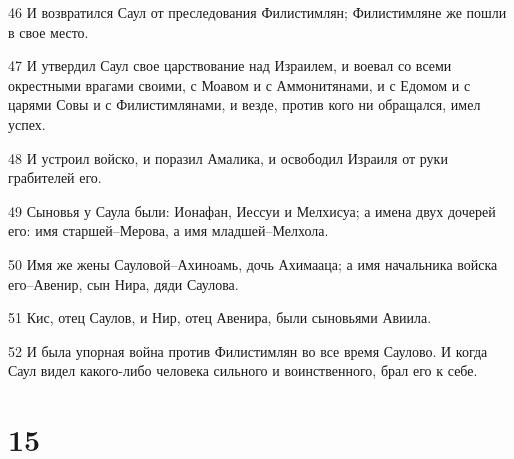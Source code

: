 \par 46 И возвратился Саул от преследования Филистимлян; Филистимляне же пошли в свое место.
\par 47 И утвердил Саул свое царствование над Израилем, и воевал со всеми окрестными врагами своими, с Моавом и с Аммонитянами, и с Едомом и с царями Совы и с Филистимлянами, и везде, против кого ни обращался, имел успех.
\par 48 И устроил войско, и поразил Амалика, и освободил Израиля от руки грабителей его.
\par 49 Сыновья у Саула были: Ионафан, Иессуи и Мелхисуа; а имена двух дочерей его: имя старшей--Мерова, а имя младшей--Мелхола.
\par 50 Имя же жены Сауловой--Ахиноамь, дочь Ахимааца; а имя начальника войска его--Авенир, сын Нира, дяди Саулова.
\par 51 Кис, отец Саулов, и Нир, отец Авенира, были сыновьями Авиила.
\par 52 И была упорная война против Филистимлян во все время Саулово. И когда Саул видел какого-либо человека сильного и воинственного, брал его к себе.

\chapter{15}

